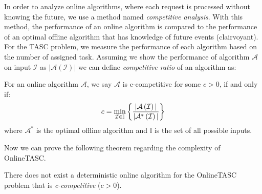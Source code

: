 In order to analyze online algorithms, where each request is processed without knowing the future, we use a method named \textit{competitive analysis}\cite{Sleator85}. With this method, the performance of an online algorithm is compared to the performance of an optimal offline algorithm that has knowledge of future events (clairvoyant). For the TASC problem, we measure the performance of each algorithm based on the number of assigned task. Assuming we show the performance of algorithm $\mathcal{A}$ on input $\mathcal{I}$ as $\vert \mathcal{A}\left( \mathcal{I} \right) \vert$ we can define \textit{competitive ratio} of an algorithm as:
\vspace{-0.05in}
\begin{definition} 
For an online algorithm $\mathcal{A}$, we say $\mathcal{A}$ is c-competitive for some $c > 0$, if and only if:
\vspace{-0.1in}
\begin{equation*}
c = \min\limits_{\mathcal{I} \in \mathbb{I}} \left\lbrace \frac{\vert \mathcal{A}\left( \mathcal{I} \right) \vert}{\vert \mathcal{A}^{*} \left( \mathcal{I} \right) \vert} \right\rbrace
\vspace{-0.1in}
\end{equation*}
where $\mathcal{A}^{*}$ is the optimal offline algorithm and $\mathbb{I}$ is the set of all possible inputs.
\end{definition}
\vspace{-0.05in}
Now we can prove the following theorem regarding the complexity of OnlineTASC.
\vspace{-0.05in}
\begin{theorem}
\label{th:comp_ratio}
There does not exist a deterministic online algorithm for the OnlineTASC problem that is \textit{c-competitive} ($c > 0$). 
\end{theorem}
\vspace{-0.2in}
